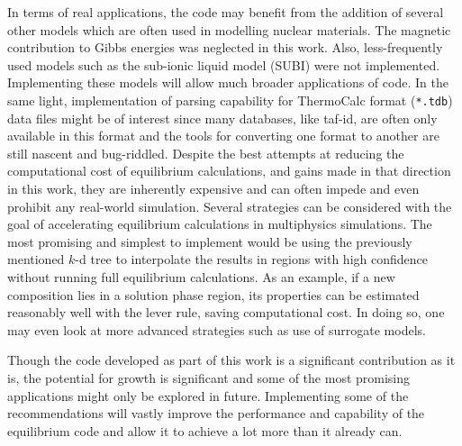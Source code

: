 	In terms of real applications, the code may benefit from the addition of several other models which are often used in modelling nuclear materials. The magnetic contribution to Gibbs energies was neglected in this work. Also, less-frequently used models such as the sub-ionic liquid model (SUBI) were not implemented. Implementing these models will allow much broader applications of code. In the same light, implementation of parsing capability for ThermoCalc format (\texttt{*.tdb}) data files might be of interest since many databases, like \gls{taf-id}, are often only available in this format and the tools for converting one format to another are still nascent and bug-riddled. Despite the best attempts at reducing the computational cost of equilibrium calculations, and gains made in that direction in this work, they are inherently expensive and can often impede and even prohibit any real-world simulation. Several strategies can be considered with the goal of accelerating equilibrium calculations in multiphysics simulations. The most promising and simplest to implement would be using the previously mentioned $k$-d tree to interpolate the results in regions with high confidence without running full equilibrium calculations. As an example, if a new composition lies in a solution phase region, its properties can be estimated reasonably well with the lever rule, saving computational cost. In doing so, one may even look at more advanced strategies such as use of surrogate models.
 
    Though the code developed as part of this work is a significant contribution as it is, the potential for growth is significant and some of the most promising applications might only be explored in future. Implementing some of the recommendations will vastly improve the performance and capability of the equilibrium code and allow it to achieve a lot more than it already can.